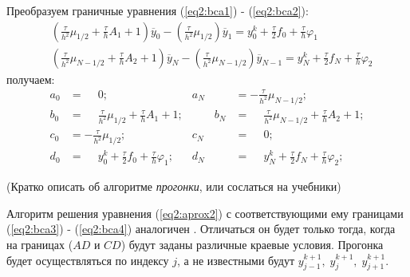 Преобразуем граничные уравнения (\ref{eq2:bca1}) - (\ref{eq2:bca2}):
\begin{align*}
    &\left(\frac{\tau}{h^{2}}\mu_{1/2} + \frac{\tau}{h}A_{1} + 1\right) \overline{y}_{0} - \left(\frac{\tau}{h^{2}}\mu_{1/2}\right)\overline{y}_{1} = y^{k}_{0} + \frac{\tau}{2} f_{0} + \frac{\tau}{h}\varphi_{1}\\
    &\left(\frac{\tau}{h^{2}}\mu_{N-1/2} + \frac{\tau}{h}A_{2} + 1\right) \overline{y}_{N} - \left(\frac{\tau}{h^{2}}\mu_{N-1/2}\right)\overline{y}_{N-1} = y^{k}_{N} + \frac{\tau}{2} f_{N} + \frac{\tau}{h}\varphi_{2}
\end{align*}
получаем:
\begin{equation}
    \label{eq2:coefficient2}
    \begin{aligned}
        a_{0} &= \phantom{-}0; &
        a_{N} &= -\frac{\tau}{h^{2}}\mu_{N-1/2};\\
        b_{0} &= \phantom{-}\frac{\tau}{h^{2}}\mu_{1/2} + \frac{\tau}{h}A_{1} + 1; & \qquad
        b_{N} &= \phantom{-}\frac{\tau}{h^{2}}\mu_{N-1/2} + \frac{\tau}{h}A_{2} + 1; \\
        c_{0} &= -\frac{\tau}{h^{2}}\mu_{1/2};&
        c_{N} &= \phantom{-}0;\\
        d_{0} &= \phantom{-}y^{k}_{0} + \frac{\tau}{2} f_{0} + \frac{\tau}{h}\varphi_{1}; & 
        d_{N} &= \phantom{-}y^{k}_{N} + \frac{\tau}{2} f_{N} + \frac{\tau}{h}\varphi_{2};
    \end{aligned}
\end{equation}

(Кратко описать об алгоритме \textit{прогонки}, или сослаться на учебники)

Алгоритм решения уравнения (\ref{eq2:aprox2}) с соответствующими ему границами (\ref{eq2:bca3}) - (\ref{eq2:bca4}) аналогичен . Отличаться он будет только тогда, когда на границах ($AD$ и $CD$)  будут заданы различные краевые условия. Прогонка будет осуществляться по индексу $j$, а не известными будут $ y^{k+1}_{j-1},\; y^{k+1}_{j},\; y^{k+1}_{j+1}$.
